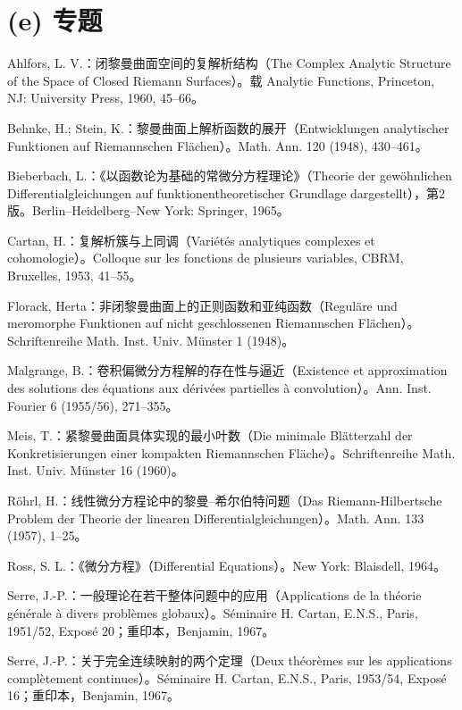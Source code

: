 \section*{(e) 专题}
\begin{description}[style=nextline,leftmargin=2em]
\item[{[50]}] Ahlfors, L. V.：闭黎曼曲面空间的复解析结构（The Complex Analytic Structure of the Space of Closed Riemann Surfaces）。载 Analytic Functions, Princeton, NJ: University Press, 1960, 45--66。
\item[{[51]}] Behnke, H.; Stein, K.：黎曼曲面上解析函数的展开（Entwicklungen analytischer Funktionen auf Riemannschen Flächen）。Math. Ann. 120 (1948), 430--461。
\item[{[52]}] Bieberbach, L.：《以函数论为基础的常微分方程理论》（Theorie der gewöhnlichen Differentialgleichungen auf funktionentheoretischer Grundlage dargestellt），第2版。Berlin--Heidelberg--New York: Springer, 1965。
\item[{[53]}] Cartan, H.：复解析簇与上同调（Variétés analytiques complexes et cohomologie）。Colloque sur les fonctions de plusieurs variables, CBRM, Bruxelles, 1953, 41--55。
\item[{[54]}] Florack, Herta：非闭黎曼曲面上的正则函数和亚纯函数（Reguläre und meromorphe Funktionen auf nicht geschlossenen Riemannschen Flächen）。Schriftenreihe Math. Inst. Univ. Münster 1 (1948)。
\item[{[55]}] Malgrange, B.：卷积偏微分方程解的存在性与逼近（Existence et approximation des solutions des équations aux dérivées partielles à convolution）。Ann. Inst. Fourier 6 (1955/56), 271--355。
\item[{[56]}] Meis, T.：紧黎曼曲面具体实现的最小叶数（Die minimale Blätterzahl der Konkretisierungen einer kompakten Riemannschen Fläche）。Schriftenreihe Math. Inst. Univ. Münster 16 (1960)。
\item[{[57]}] Röhrl, H.：线性微分方程论中的黎曼--希尔伯特问题（Das Riemann-Hilbertsche Problem der Theorie der linearen Differentialgleichungen）。Math. Ann. 133 (1957), 1--25。
\item[{[58]}] Ross, S. L.：《微分方程》（Differential Equations）。New York: Blaisdell, 1964。
\item[{[59]}] Serre, J.-P.：一般理论在若干整体问题中的应用（Applications de la théorie générale à divers problèmes globaux）。Séminaire H. Cartan, E.N.S., Paris, 1951/52, Exposé 20；重印本，Benjamin, 1967。
\item[{[60]}] Serre, J.-P.：关于完全连续映射的两个定理（Deux théorèmes sur les applications complètement continues）。Séminaire H. Cartan, E.N.S., Paris, 1953/54, Exposé 16；重印本，Benjamin, 1967。

\end{description}

